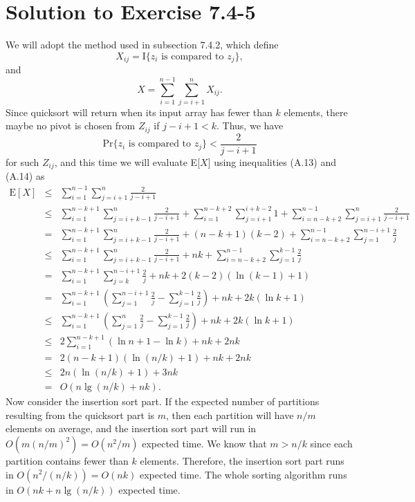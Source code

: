 \documentclass[a4paper, fleqn]{article}
\begin{document}
\section*{Solution to Exercise 7.4-5}
We will adopt the method used in subsection 7.4.2, which define
\[
X_{ij} = \mbox{I}\{z_i \mbox{ is compared to } z_j\},
\]
and
\[
X = \sum_{i=1}^{n-1} \sum_{j=i+1}^n X_{ij}.
\]
Since quicksort will return when its input array has fewer than $k$ elements, 
there maybe no pivot is chosen from $Z_{ij}$ if $j - i + 1 < k$. Thus, we have
\[
\mbox{Pr}\{z_i \mbox{ is compared to } z_j\} < \frac{2}{j - i + 1}
\]
for such $Z_{ij}$, and this time we will evaluate E[$X$] using inequalities 
(A.13) and (A.14) as
\begin{eqnarray*}
\mbox{E}[X] 
& \leq & \sum_{i=1}^{n-1}\sum_{j=i+1}^n \frac{2}{j-i+1} \\
& \leq & \sum_{i=1}^{n-k+1}\sum_{j=i+k-1}^n \frac{2}{j-i+1} + 
         \sum_{i=1}^{n-k+2}\sum_{j=i+1}^{i+k-2} 1 + 
         \sum_{i=n-k+2}^{n-1}\sum_{j=i+1}^n \frac{2}{j-i+1} \\
& = & \sum_{i=1}^{n-k+1}\sum_{j=i+k-1}^n \frac{2}{j-i+1} + (n-k+1)(k-2) + 
      \sum_{i=n-k+2}^{n-1}\sum_{j=1}^{n-i+1} \frac{2}{j} \\
& \leq & \sum_{i=1}^{n-k+1}\sum_{j=i+k-1}^n \frac{2}{j-i+1} + nk + 
         \sum_{i=n-k+2}^{n-1}\sum_{j=1}^{k-1} \frac{2}{j} \\
& = & \sum_{i=1}^{n-k+1}\sum_{j=k}^{n-i+1} \frac{2}{j} + nk + 
      2(k-2)(\ln(k-1) + 1) \\
& = & \sum_{i=1}^{n-k+1}\left(\sum_{j=1}^{n-i+1}\frac{2}{j} - 
      \sum_{j=1}^{k-1}\frac{2}{j}\right) + nk + 2k(\ln k + 1) \\
& \leq & \sum_{i=1}^{n-k+1}\left(\sum_{j=1}^{n}\frac{2}{j} - 
         \sum_{j=1}^{k-1}\frac{2}{j}\right) + nk + 2k(\ln k + 1) \\
& \leq & 2\sum_{i=1}^{n-k+1}\left(\ln n + 1 - \ln k\right) + nk + 2nk \\
& = & 2(n-k+1)(\ln(n/k) + 1) + nk + 2nk \\
& \leq & 2n(\ln(n/k) + 1) + 3nk \\
& = & O(n\lg(n/k) + nk).
\end{eqnarray*}
\indent
Now consider the insertion sort part. If the expected number of partitions 
resulting from the quicksort part is $m$, then each partition will have $n/m$ 
elements on average, and the insertion sort part will run in $O(m(n/m)^2) = 
O(n^2/m)$ expected time. We know that $m > n/k$ since each partition contains 
fewer than $k$ elements. Therefore, the insertion sort part runs in $O(n^2/(n/k)) 
= O(nk)$ expected time. The whole sorting algorithm runs in $O(nk + n\lg(n/k))$ 
expected time.
\end{document}
